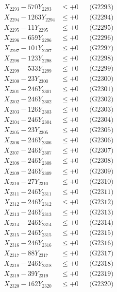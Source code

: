 \documentclass[a4paper,10pt]{article}
\begin{document}
{\begin{align}
X_{2293} - 570Y_{2293} &\leq +0 && \text{(G2293)} \\
X_{2294} - 1263Y_{2294} &\leq +0 && \text{(G2294)} \\
X_{2295} - 11Y_{2295} &\leq +0 && \text{(G2295)} \\
X_{2296} - 659Y_{2296} &\leq +0 && \text{(G2296)} \\
X_{2297} - 101Y_{2297} &\leq +0 && \text{(G2297)} \\
X_{2298} - 123Y_{2298} &\leq +0 && \text{(G2298)} \\
X_{2299} - 533Y_{2299} &\leq +0 && \text{(G2299)} \\
X_{2300} - 23Y_{2300} &\leq +0 && \text{(G2300)} \\
\allowbreak
X_{2301} - 246Y_{2301} &\leq +0 && \text{(G2301)} \\
X_{2302} - 246Y_{2302} &\leq +0 && \text{(G2302)} \\
X_{2303} - 126Y_{2303} &\leq +0 && \text{(G2303)} \\
X_{2304} - 246Y_{2304} &\leq +0 && \text{(G2304)} \\
X_{2305} - 23Y_{2305} &\leq +0 && \text{(G2305)} \\
X_{2306} - 246Y_{2306} &\leq +0 && \text{(G2306)} \\
X_{2307} - 246Y_{2307} &\leq +0 && \text{(G2307)} \\
X_{2308} - 246Y_{2308} &\leq +0 && \text{(G2308)} \\
X_{2309} - 246Y_{2309} &\leq +0 && \text{(G2309)} \\
X_{2310} - 27Y_{2310} &\leq +0 && \text{(G2310)} \\
\allowbreak
X_{2311} - 246Y_{2311} &\leq +0 && \text{(G2311)} \\
X_{2312} - 246Y_{2312} &\leq +0 && \text{(G2312)} \\
X_{2313} - 246Y_{2313} &\leq +0 && \text{(G2313)} \\
X_{2314} - 246Y_{2314} &\leq +0 && \text{(G2314)} \\
X_{2315} - 246Y_{2315} &\leq +0 && \text{(G2315)} \\
X_{2316} - 246Y_{2316} &\leq +0 && \text{(G2316)} \\
X_{2317} - 88Y_{2317} &\leq +0 && \text{(G2317)} \\
X_{2318} - 246Y_{2318} &\leq +0 && \text{(G2318)} \\
X_{2319} - 39Y_{2319} &\leq +0 && \text{(G2319)} \\
X_{2320} - 162Y_{2320} &\leq +0 && \text{(G2320)} \\

\end{align}}
\end{document}
